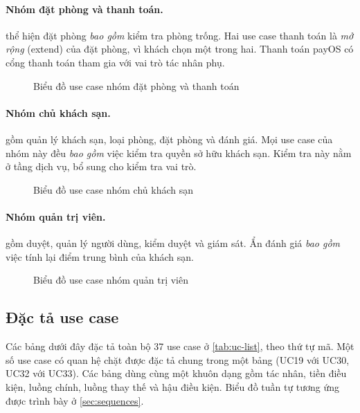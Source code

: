 \paragraph{Nhóm đặt phòng và thanh toán.}  thể hiện đặt phòng \emph{bao gồm} kiểm tra phòng trống. Hai use case thanh toán là \emph{mở rộng} (extend) của đặt phòng, vì khách chọn một trong hai. Thanh toán payOS có cổng thanh toán tham gia với vai trò tác nhân phụ.

\begin{figure}[H]
\centering
{}
\caption{Biểu đồ use case nhóm đặt phòng và thanh toán}\label{fig:uc-booking}
\end{figure}

\paragraph{Nhóm chủ khách sạn.}  gồm quản lý khách sạn, loại phòng, đặt phòng và đánh giá. Mọi use case của nhóm này đều \emph{bao gồm} việc kiểm tra quyền sở hữu khách sạn. Kiểm tra này nằm ở tầng dịch vụ, bổ sung cho kiểm tra vai trò.

\begin{figure}[H]
\centering
{}
\caption{Biểu đồ use case nhóm chủ khách sạn}\label{fig:uc-owner}
\end{figure}

\paragraph{Nhóm quản trị viên.}  gồm duyệt, quản lý người dùng, kiểm duyệt và giám sát. Ẩn đánh giá \emph{bao gồm} việc tính lại điểm trung bình của khách sạn.

\begin{figure}[H]
\centering
{}
\caption{Biểu đồ use case nhóm quản trị viên}\label{fig:uc-admin}
\end{figure}

\subsection{Đặc tả use case}\label{sec:uc-spec}

Các bảng dưới đây đặc tả toàn bộ 37 use case ở \cref{tab:uc-list}, theo thứ tự mã. Một số use case có quan hệ chặt được đặc tả chung trong một bảng (UC19 với UC30, UC32 với UC33). Các bảng dùng cùng một khuôn dạng gồm tác nhân, tiền điều kiện, luồng chính, luồng thay thế và hậu điều kiện. Biểu đồ tuần tự tương ứng được trình bày ở \cref{sec:sequences}.


